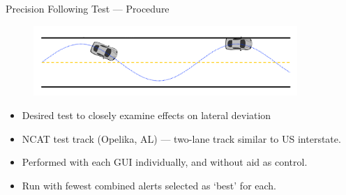 \documentclass{beamer}
\begin{document}
    \begin{frame}{Precision Following Test --- Procedure}
      \begin{figure}
        \includegraphics[width=10cm]{../graphics/precision_following_diagram.png}
      \end{figure}   
      \begin{itemize} \footnotesize
        \item Desired test to closely examine effects on lateral deviation 
        \item NCAT test track (Opelika, AL) --- two-lane track similar to US interstate.
        \item Performed with each GUI individually, and without aid as control.
        \item Run with fewest combined alerts selected as `best' for each.
      \end{itemize}
    \end{frame}
\end{document}
